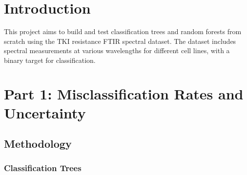 \documentclass[fleqn,moreauthors,10pt]{ds_report}
\begin{document}
\flushbottom 

\maketitle

\thispagestyle{empty} 


\section*{Introduction}

This project aims to build and test classification trees and random forests from scratch using the TKI resistance FTIR spectral dataset. The dataset includes spectral measurements at various wavelengths for different cell lines, with a binary target for classification.
%
%



\section*{Part 1: Misclassification Rates and Uncertainty}

\subsection*{Methodology}

\subsubsection*{Classification Trees}
\end{document}
